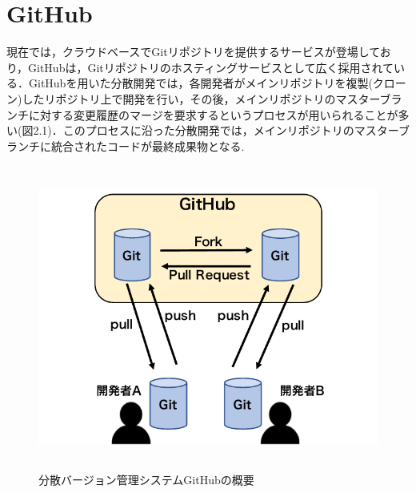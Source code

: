 \documentclass{funthesis}
\begin{document}
\section{GitHub}

現在では，クラウドベースでGitリポジトリを提供するサービスが登場しており，GitHubは，Gitリポジトリのホスティングサービスとして広く採用されている．GitHubを用いた分散開発では，各開発者がメインリポジトリを複製(クローン)したリポジトリ上で開発を行い，その後，メインリポジトリのマスターブランチに対する変更履歴のマージを要求するというプロセスが用いられることが多い(図2.1)．このプロセスに沿った分散開発では，メインリポジトリのマスターブランチに統合されたコードが最終成果物となる\cite{Matsubara}.
\begin{figure}[H]
\centering  %
\includegraphics[clip,width = 12cm,height=10cm]{figures/github.pdf}
\caption{分散バージョン管理システムGitHubの概要}    \label{sample}
\end{figure}
\end{document}
